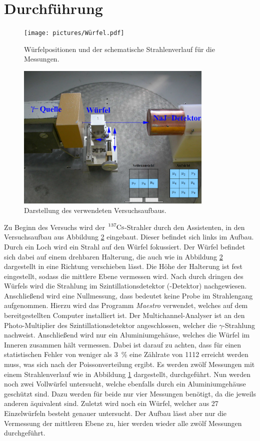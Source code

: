 \newpage
\section{Durchführung}
\label{sec:Durchführung}

\begin{figure}[htb]
  \centering
  \texttt{[image: pictures/Würfel.pdf]}
  \caption{Würfelpositionen und der schematische Strahlenverlauf für die Messungen.}
  \label{fig:wuerfel}
\end{figure}

\begin{figure}[htb]
  \centering
  \includegraphics[height=7.0cm]{content/pictures/Aufbau.png}
  \caption{Darstellung des verwendeten Versuchsaufbaus.\cite{anleitung}}
  \label{fig:Aufbau}
\end{figure}
Zu Beginn des Versuchs wird der $\ce{^137Cs}$-Strahler durch den Assistenten, in den Versuchsaufbau aus Abbildung \ref{fig:Aufbau} eingebaut. 
Dieser befindet sich links im Aufbau. 
Durch ein Loch wird ein Strahl auf den Würfel fokussiert.
Der Würfel befindet sich dabei auf einem drehbaren Halterung, die auch wie in Abbildung \ref{fig:Aufbau} dargestellt in eine Richtung verschieben lässt.
Die Höhe der Halterung ist fest eingestellt, sodass die mittlere Ebene vermessen wird.
Nach durch dringen des Würfels wird die Strahlung im Szintillationsdetektor (-Detektor) nachgewiesen.
Anschließend wird eine Nullmessung, dass bedeutet keine Probe im Strahlengang aufgenommen.
Hierzu wird das Programm \textit{Maestro} verwendet, welches auf dem bereitgestellten Computer installiert ist.
Der Multichannel-Analyser ist an den Photo-Multiplier des Szintillationsdetektor angeschlossen, welcher die $\gamma$-Strahlung nachweist.
Anschließend wird nur ein Aluminiumgehäuse, welches die Würfel im Inneren zusammen hält vermessen. Dabei ist darauf zu achten, dass für einen statistischen Fehler
von weniger als \SI{3}{\percent} eine Zählrate von \num{1112} erreicht werden muss, was sich nach der Poissonverteilung ergibt. Es werden zwölf Messungen mit einem Strahlenverlauf wie in Abbildung \ref{fig:wuerfel} dargestellt, durchgeführt.
Nun werden noch zwei Vollwürfel untersucht, welche ebenfalls durch ein Aluminiumgehäuse geschützt sind. Dazu werden für beide nur vier Messungen benötigt,
da die jeweils anderen äquivalent sind.
Zuletzt wird noch ein Würfel, welcher aus \num{27} Einzelwürfeln besteht genauer untersucht. Der Aufbau lässt aber nur die Vermessung der mittleren Ebene zu, hier werden 
wieder alle zwölf Messungen durchgeführt.
\FloatBarrier